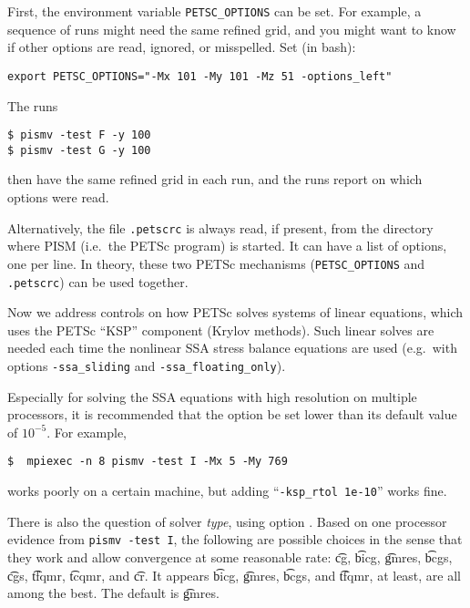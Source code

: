 First, the environment variable \texttt{PETSC_OPTIONS} can be set.  For example, a sequence of runs might need the same refined grid, and you might want to know if other options are read, ignored, or misspelled.  Set (in bash):

\texttt{export PETSC_OPTIONS="-Mx 101 -My 101 -Mz 51 -options_left"}

\noindent The runs 
\begin{verbatim}
$ pismv -test F -y 100
$ pismv -test G -y 100
\end{verbatim}
\noindent then have the same refined grid in each run, and the runs report on which options were read.

Alternatively, the file \texttt{.petscrc} is always read, if present, from the directory where PISM (i.e.~the PETSc program) is started.  It can have a list of options, one per line.   In theory, these two PETSc mechanisms (\verb|PETSC_OPTIONS| and \verb|.petscrc|) can be used together.


Now we address controls on how PETSc solves systems of linear equations, which uses the PETSc ``KSP'' component (Krylov methods).  Such linear solves are needed each time the nonlinear SSA stress balance equations are used (e.g.~with options \texttt{-ssa_sliding} and \texttt{-ssa_floating_only}).

Especially for solving the SSA equations with high resolution on multiple processors, it is recommended that the option  be set lower than its default value of $10^{-5}$.  For example, 

\begin{verbatim}
$  mpiexec -n 8 pismv -test I -Mx 5 -My 769
\end{verbatim}

\noindent works poorly on a certain machine, but adding ``\verb|-ksp_rtol 1e-10|'' works fine.

There is also the question of solver \emph{type}, using option .  Based on one processor evidence from \texttt{pismv -test I}, the following are possible choices in the sense that they work and allow convergence at some reasonable rate: \t{cg}, \t{bicg}, \t{gmres}, \t{bcgs}, \t{cgs}, \t{tfqmr}, \t{tcqmr}, and \t{cr}.  It appears \t{bicg}, \t{gmres}, \t{bcgs}, and \t{tfqmr}, at least, are all among the best.  The default is \t{gmres}.

